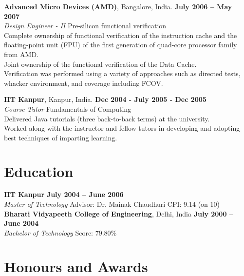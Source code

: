 \documentclass[margin,line]{resume}
\begin{document}
\begin{resume}
	\textbf{Advanced Micro Devices (AMD)}, Bangalore, India. \hfill \textbf{July 2006 -- May 2007}\vspace{2mm}\\\vspace{1mm}%
	\textsl{Design Engineer - II} \hfill Pre-silicon functional verification\\
	Complete ownership of functional verification of the instruction cache and the floating-point unit (FPU) of the first generation of quad-core processor family from AMD.\\
	Joint ownership of the functional verification of the Data Cache.\\
	Verification was performed using a variety of approaches such as directed tests, whacker environment, and coverage including FCOV.

	\textbf{IIT Kanpur}, Kanpur, India. \hfill \textbf{Dec 2004 - July 2005 - Dec 2005} \vspace{2mm}\\\vspace{1mm}%
	\textsl{Course Tutor} \hfill Fundamentals of Computing\\
	Delivered Java tutorials (three back-to-back terms) at the university.\\
	Worked along with the instructor and fellow tutors in developing and adopting best techniques of imparting learning.

	\vfill \break

	\section{\mysidestyle Education}

	\textbf{IIT Kanpur} \hfill \textbf{July 2004 -- June 2006}\\
	\textsl{Master of Technology} \hfill Advisor:  Dr. Mainak Chaudhuri \hfill CPI: $9.14$ (on $10$)\vspace{2mm}\\%
	\textbf{Bharati Vidyapeeth College of Engineering}, Delhi, India \hfill \textbf{July 2000 -- June 2004}\\
	\textsl{Bachelor of Technology} \hfill Score: $79.80$\%

	\section{\mysidestyle Honours and Awards}


\end{resume}
\end{document}
